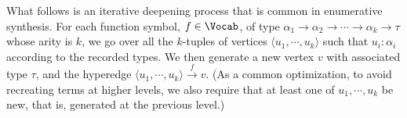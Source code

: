 What follows is an iterative deepening process that is common in enumerative synthesis.
For each function symbol, $f\in\Vocab$, of type $\alpha_1\to\alpha_2\to\cdots\to\alpha_k\to\tau$
whose arity is $k$, we go over all the $k$-tuples of vertices $\langle u_1, \cdots, u_k\rangle$
such that $u_i : \alpha_i$ according to the recorded types.
We then generate a new vertex $v$ with associated type $\tau$, and the hyperedge
$\langle u_1, \cdots, u_k\rangle\xrightarrow{f}v$.
(As a common optimization, to avoid recreating terms at higher levels, we also require that
at least one of $u_1,\cdots,u_k$ be new, that is, generated at the previous level.)

\begin{comment}

To understand the creation of all terms into a compact structure, first how the terms are created is discussed, then we consider how they are merged, which is the next step in the process. To create all terms in the given language, special rewrite rules and accompanying hyper graph are created. Consider a grammar $\mathcal{G}$ of identifiers $i_j$ and accompanying types $t_j$. We separate identifiers by type, between functions and values. Starting with the hyper graph, all values in the grammar are inserted into an empty graph with their accompanying types. With the hyper graph ready we can build deeper terms using the function symbols from the grammar. Each function symbol is translated into a rewrite rule, matching parameters from the existing graph by type and resulting in a new vertex in the hyper graph, representing the created term. Practically in addition to the initial values created from the grammar, values for each type appearing in the grammar are generated, which we will refer to as placeholder values. Their purpose is to make sure all terms are created and are later on used for the equivalence step as is explained in section 2.3. For simplicity, for each type two placeholder values are created marked as $V_{p_i}$.

\begin{equation}
    \mathcal{G} := \left(\left\{v_1: t_1, v_2: t_2, \ldots, v_n: t_n\right\}, \left\{f_1: t'_1, f_2: t'_2, \ldots, f_m: t'_m\right\}\right)
\end{equation}

 


\end{comment}
